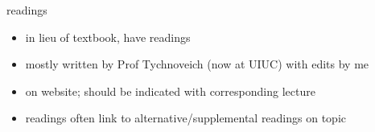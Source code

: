 \begin{frame}{readings}
    \begin{itemize}
    \item in lieu of textbook, have readings
    \item mostly written by Prof Tychnoveich (now at UIUC) with edits by me
    \vspace{.5cm}
    \item on website; should be indicated with corresponding lecture
    \item readings often link to alternative/supplemental readings on topic
    \end{itemize}
\end{frame}
